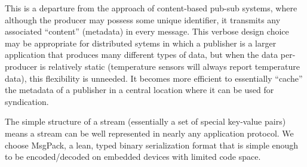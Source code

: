 This is a departure from the approach of content-based pub-sub systems, where although the producer may possess some unique identifier, it transmits any associated ``content'' (metadata) in every message.
This verbose design choice may be appropriate for distributed sytems in which a publisher is a larger application that produces many different types of data, but when the data per-producer is relatively static (temperature sensors will always report temperature data), this flexibility is unneeded.
It becomes more efficient to essentially ``cache'' the metadata of a publisher in a central location where it can be used for syndication.

The simple structure of a stream (essentially a set of special key-value pairs) means a stream can be well represented in nearly any application protocol.
We choose MsgPack, a lean, typed binary serialization format that is simple enough to be encoded/decoded on embedded devices with limited code space.



